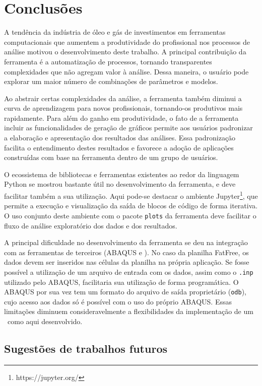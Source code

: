 \chapter{Conclusões}\label{chap:conclusao}


A tendência da indústria de óleo e gás de investimentos em ferramentas computacionais que aumentem a produtividade do profissional nos processos de análise motivou o desenvolvimento deste trabalho. A principal contribuição da ferramenta é a automatização de processos, tornando transparentes complexidades que não agregam valor à análise. Dessa maneira, o usuário pode explorar um maior número de combinações de parâmetros e modelos.

Ao abstrair certas complexidades da análise, a ferramenta também diminui a curva de aprendizagem para novos profissionais, tornando-os produtivos mais rapidamente.
Para além do ganho em produtividade, o fato de a ferramenta incluir as funcionalidades de geração de gráficos permite aos usuários padronizar a elaboração e apresentação dos resultados das análises. Essa padronização facilita o entendimento destes resultados e favorece a adoção de aplicações construídas com base na ferramenta dentro de um grupo de usuários.

O ecossistema de bibliotecas e ferramentas existentes ao redor da linguagem Python se mostrou bastante útil no desenvolvimento da ferramenta, e deve facilitar também a sua utilização. Aqui pode-se destacar o ambiente Jupyter\footnote{https://jupyter.org/}, que permite a execução e visualização da saída de blocos de código de forma iterativa. O uso conjunto deste ambiente com o pacote \texttt{plots} da ferramenta deve facilitar o fluxo de análise exploratório dos dados e dos resultados.

A principal dificuldade no desenvolvimento da ferramenta se deu na integração com as ferramentas de terceiros (ABAQUS e \fatfree). No caso da planilha FatFree, os dados devem ser inseridos nas células da planilha na própria aplicação. Se fosse possível a utilização de um arquivo de entrada com os dados, assim como o \texttt{.inp} utilizado pelo ABAQUS, facilitaria sua utilização de forma programática. O ABAQUS por sua vez tem um formato do arquivo de saída proprietário (\texttt{odb}), cujo acesso aos dados só é possível com o uso do próprio ABAQUS. Essas limitações diminuem consideravelmente a flexibilidades da implementação de um \frame\ como aqui desenvolvido.


\section{Sugestões de trabalhos futuros}


